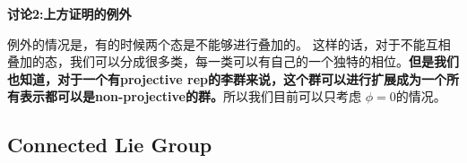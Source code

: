 \textbf{讨论2:上方证明的例外}

例外的情况是，有的时候两个态是不能够进行叠加的。
这样的话，对于不能互相叠加的态，我们可以分成很多类，每一类可以有自己的一个独特的相位。\textbf{但是我们也知道，对于一个有projective rep的李群来说，这个群可以进行扩展成为一个所有表示都可以是non-projective的群。}所以我们目前可以只考虑 $ \phi = 0 $的情况。 
\subsection{Connected Lie Group}

